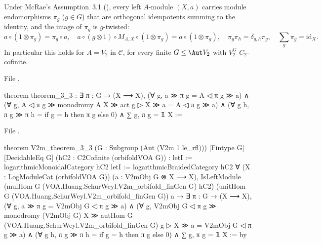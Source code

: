 \begin{theorem}\label{l22:thm:O4c}
Under McRae's Assumption~3.1 (), every left $A$-module $(X,a)$ carries module endomorphisms
$\pi_g$ ($g\in G$) that are orthogonal idempotents summing to the identity, and the image of $\pi_g$ is
$g$-twisted:
\begin{equation*}
  a\circ(1\otimes\pi_g)=\pi_g\circ a,\quad a\circ(g\otimes1)\circ M_{A,X}\circ(1\otimes\pi_g)=a\circ(1\otimes\pi_g),\quad
  \pi_g\pi_h=\delta_{g,h}\pi_g,\quad \sum_g\pi_g=\mathrm{id}_X .
\end{equation*}
In particular this holds for $A=V_2$ in $\mathcal C$, for every finite $G\le\Aut V_2$ with $V_2^G$ $C_2$-cofinite.
\end{theorem}
\noindent File .
\begin{leancode}
theorem theorem_3_3 :
    ∃ π : G → (X ⟶ X),
      (∀ g, a ≫ π g = A ◁ π g ≫ a) ∧
      (∀ g, A ◁ π g ≫ monodromy A X ≫ act g ▷ X ≫ a = A ◁ π g ≫ a) ∧
      (∀ g h, π g ≫ π h = if g = h then π g else 0) ∧
      ∑ g, π g = 𝟙 X :=
\end{leancode}
\noindent File .
\begin{leancode}
theorem V2m_theorem_3_3 (G : Subgroup (Aut (V2m 1 le_rfl))) [Fintype G] [DecidableEq G]
    (hC2 : C2Cofinite (orbifoldVOA G)) :
    letI := logarithmicMonoidalCategory hC2
    letI := logarithmicBraidedCategory hC2
    ∀ (X : LogModuleCat (orbifoldVOA G)) (a : V2mObj G ⊗ X ⟶ X),
      IsLeftModule (mulHom G (VOA.Huang.SchurWeyl.V2m_orbifold_finGen G) hC2)
        (unitHom G (VOA.Huang.SchurWeyl.V2m_orbifold_finGen G)) a →
      ∃ π : G → (X ⟶ X),
        (∀ g, a ≫ π g = V2mObj G ◁ π g ≫ a) ∧
        (∀ g, V2mObj G ◁ π g ≫ monodromy (V2mObj G) X ≫
            autHom G (VOA.Huang.SchurWeyl.V2m_orbifold_finGen G) g ▷ X ≫ a =
          V2mObj G ◁ π g ≫ a) ∧
        (∀ g h, π g ≫ π h = if g = h then π g else 0) ∧
        ∑ g, π g = 𝟙 X := by
\end{leancode}

